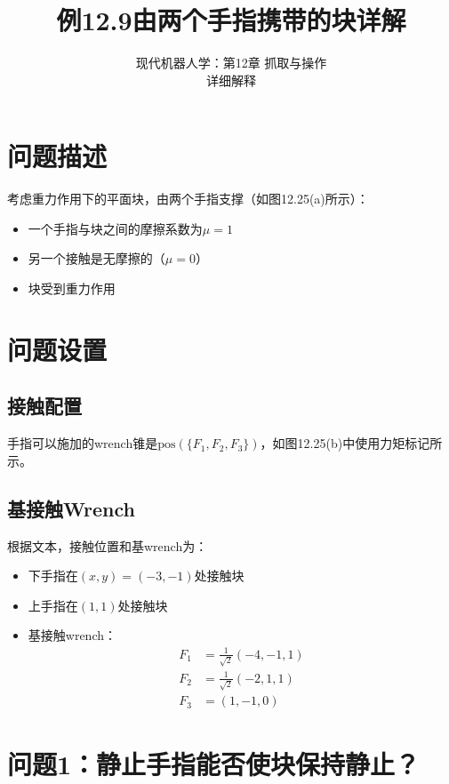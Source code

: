 \documentclass[12pt,a4paper]{article}
\title{例12.9\quad 由两个手指携带的块\quad 详解}
\author{现代机器人学：第12章 抓取与操作\\
详细解释}
\date{}
\begin{document}
\maketitle

\section{问题描述}

考虑重力作用下的平面块，由两个手指支撑（如图12.25(a)所示）：
\begin{itemize}
    \item 一个手指与块之间的摩擦系数为$\mu = 1$
    \item 另一个接触是无摩擦的（$\mu = 0$）
    \item 块受到重力作用
\end{itemize}

\section{问题设置}

\subsection{接触配置}

手指可以施加的wrench锥是$\text{pos}(\{F_1, F_2, F_3\})$，如图12.25(b)中使用力矩标记所示。

\subsection{基接触Wrench}

根据文本，接触位置和基wrench为：
\begin{itemize}
    \item 下手指在$(x, y) = (-3, -1)$处接触块
    \item 上手指在$(1, 1)$处接触块
    \item 基接触wrench：
    \begin{align}
    F_1 &= \frac{1}{\sqrt{2}}(-4, -1, 1) \\
    F_2 &= \frac{1}{\sqrt{2}}(-2, 1, 1) \\
    F_3 &= (1, -1, 0)
    \end{align}
\end{itemize}

\section{问题1：静止手指能否使块保持静止？}
\end{document}
